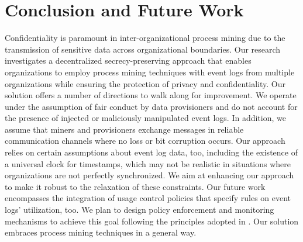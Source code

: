 \section{Conclusion and Future Work}
\label{sec:conclusion}
Confidentiality is paramount in inter-organizational
process mining due to the transmission of sensitive data across organizational boundaries. Our research investigates a decentralized secrecy-preserving approach that enables organizations to employ process mining techniques with event logs from multiple organizations while ensuring the protection of privacy and confidentiality. Our solution offers a number of directions %
to walk along for improvement. We operate under the assumption of fair conduct by data provisioners and do not account for the presence of injected or maliciously manipulated event logs. In addition, we assume that miners and provisioners exchange messages in reliable communication channels where no loss or bit corruption occurs. Our approach relies on certain assumptions about event log data, too, including the existence of a universal clock for timestamps, which may not be realistic in situations where organizations are not perfectly synchronized. %
We aim at enhancing our approach to make it robust to the relaxation of these constraints. 
%
%
Our future work encompasses the integration of usage control policies that specify rules on event logs' utilization, too. We plan to design policy enforcement and monitoring mechanisms to achieve this goal following the principles adopted in \cite{basile2023blockchain,basile2023solid}. Our solution embraces process mining techniques in a general way. %


